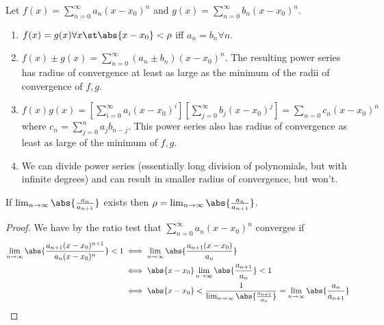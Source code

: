 \begin{proposition}
    Let $f(x) = \sum_{n =0}^\infty a_n (x-x_0)^n$ and $g(x) = \sum_{n=0}^\infty b_n(x-x_0)^n$.
    \begin{enumerate}
        \item $f(x) = g(x) \forall x \st \abs{x - x_0} < \rho$ iff $a_n = b_n \forall n$.
        \item $f(x) \pm g(x) = \sum_{n=0}^\infty (a_n \pm b_n)(x-x_0)^n$. The resulting power series has radius of convergence at least as large as the minimum of the radii of convergence of $f, g$.
        \item $f(x)g(x) = [\sum_{i=0}^\infty a_i (x-x_0)^i][\sum_{j=0}^\infty b_j (x-x_0)^j] = \sum_{n=0} c_n(x-x_0)^n$ where $c_n = \sum_{j=0}^n a_j b_{n-j}$. This power series also has radius of convergence as least as large of the minimum of $f, g$.
        \item We can divide power series (essentially long division of polynomials, but with infinite degrees) and can result in smaller radius of convergence, but won't.
    \end{enumerate}
\end{proposition}

\begin{proposition}
    If $\lim_{n \to \infty} \abs{\frac{a_n}{a_{n+1}}}$ exists then $\rho = \lim_{n \to \infty} \abs{\frac{a_n}{a_{n+1}}}$.
\end{proposition}
\begin{proof}
We have by the ratio test that $\sum_{n=0}^\infty a_n(x-x_0)^n$ converges if \begin{align*}
    \lim_{n \to \infty} \abs{\frac{a_{n+1}(x-x_0)^{n+1}}{a_n(x-x_0)^n}} < 1 &\iff \lim_{n \to \infty} \abs{\frac{a_{n+1}(x-x_0)}{a_n}}\\
    &\iff \abs{x - x_0}\lim_{n \to \infty} \abs{\frac{a_{n+1}}{a_n}} < 1\\
    &\iff \abs{x - x_0} < \frac{1}{\lim_{n \to \infty }\abs{\frac{a_{n+1}}{a_n}}} = \lim_{n \to \infty} \abs{\frac{a_n}{a_{n+1}}}
\end{align*}
\end{proof}

